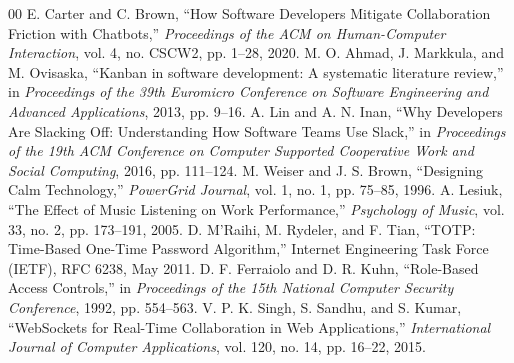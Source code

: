 \documentclass[conference]{IEEEtran}
\begin{document}
\begin{thebibliography}{00}
 E. Carter and C. Brown, ``How Software Developers Mitigate Collaboration Friction with Chatbots,'' \textit{Proceedings of the ACM on Human-Computer Interaction}, vol. 4, no. CSCW2, pp. 1--28, 2020.
 M. O. Ahmad, J. Markkula, and M. Ovisaska, ``Kanban in software development: A systematic literature review,'' in \textit{Proceedings of the 39th Euromicro Conference on Software Engineering and Advanced Applications}, 2013, pp. 9--16.
 A. Lin and A. N. Inan, ``Why Developers Are Slacking Off: Understanding How Software Teams Use Slack,'' in \textit{Proceedings of the 19th ACM Conference on Computer Supported Cooperative Work and Social Computing}, 2016, pp. 111--124.
 M. Weiser and J. S. Brown, ``Designing Calm Technology,'' \textit{PowerGrid Journal}, vol. 1, no. 1, pp. 75--85, 1996.
 A. Lesiuk, ``The Effect of Music Listening on Work Performance,'' \textit{Psychology of Music}, vol. 33, no. 2, pp. 173--191, 2005.
 D. M'Raihi, M. Rydeler, and F. Tian, ``TOTP: Time-Based One-Time Password Algorithm,'' Internet Engineering Task Force (IETF), RFC 6238, May 2011.
 D. F. Ferraiolo and D. R. Kuhn, ``Role-Based Access Controls,'' in \textit{Proceedings of the 15th National Computer Security Conference}, 1992, pp. 554--563.
 V. P. K. Singh, S. Sandhu, and S. Kumar, ``WebSockets for Real-Time Collaboration in Web Applications,'' \textit{International Journal of Computer Applications}, vol. 120, no. 14, pp. 16--22, 2015.
\end{thebibliography}
\end{document}
